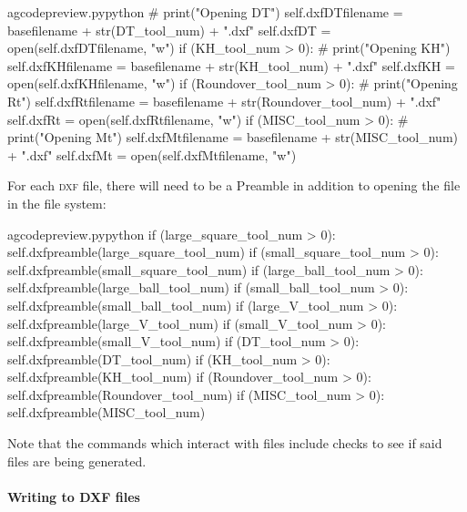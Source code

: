 \documentclass{ltxdoc}
\begin{document}
\begin{writecode}{a}{gcodepreview.py}{python}
#                print("Opening DT")
                self.dxfDTfilename = basefilename + str(DT_tool_num) + ".dxf"
                self.dxfDT = open(self.dxfDTfilename, "w")
            if (KH_tool_num > 0):
#                print("Opening KH")
                self.dxfKHfilename = basefilename + str(KH_tool_num) + ".dxf"
                self.dxfKH = open(self.dxfKHfilename, "w")
            if (Roundover_tool_num > 0):
#                print("Opening Rt")
                self.dxfRtfilename = basefilename + str(Roundover_tool_num) + ".dxf"
                self.dxfRt = open(self.dxfRtfilename, "w")
            if (MISC_tool_num > 0):
#                print("Opening Mt")
                self.dxfMtfilename = basefilename + str(MISC_tool_num) + ".dxf"
                self.dxfMt = open(self.dxfMtfilename, "w")
\end{writecode}
\addtocounter{gcpy}{94}

For each \textsc{dxf} file, there will need to be a Preamble in addition to opening the file in the file system:

\lstset{firstnumber=\thegcpy}
\begin{writecode}{a}{gcodepreview.py}{python}
            if (large_square_tool_num > 0):
                self.dxfpreamble(large_square_tool_num)
            if (small_square_tool_num > 0):
                self.dxfpreamble(small_square_tool_num)
            if (large_ball_tool_num > 0):
                self.dxfpreamble(large_ball_tool_num)
            if (small_ball_tool_num > 0):
                self.dxfpreamble(small_ball_tool_num)
            if (large_V_tool_num > 0):
                self.dxfpreamble(large_V_tool_num)
            if (small_V_tool_num > 0):
                self.dxfpreamble(small_V_tool_num)
            if (DT_tool_num > 0):
                self.dxfpreamble(DT_tool_num)
            if (KH_tool_num > 0):
                self.dxfpreamble(KH_tool_num)
            if (Roundover_tool_num > 0):
                self.dxfpreamble(Roundover_tool_num)
            if (MISC_tool_num > 0):
                self.dxfpreamble(MISC_tool_num)

\end{writecode}
\addtocounter{gcpy}{21}

Note that the commands which interact with files include checks to see if said files are being generated.

\paragraph{Writing to DXF files}
 
\end{document}
